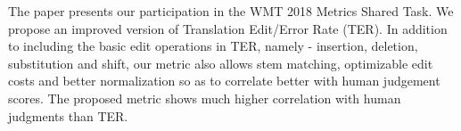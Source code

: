 The paper presents our participation in the WMT 2018 Metrics Shared Task. We propose an improved version of Translation Edit/Error Rate (TER). In addition to including the basic edit operations in TER, namely - insertion, deletion, substitution and shift, our metric also allows stem matching, optimizable edit costs and better normalization so as to correlate better with human judgement scores. The proposed metric shows much higher correlation with human judgments than TER.
